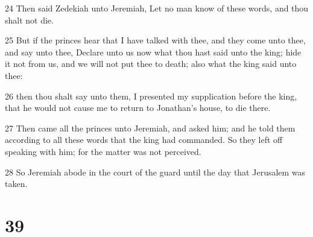 \par 24 Then said Zedekiah unto Jeremiah, Let no man know of these words, and thou shalt not die.
\par 25 But if the princes hear that I have talked with thee, and they come unto thee, and say unto thee, Declare unto us now what thou hast said unto the king; hide it not from us, and we will not put thee to death; also what the king said unto thee:
\par 26 then thou shalt say unto them, I presented my supplication before the king, that he would not cause me to return to Jonathan's house, to die there.
\par 27 Then came all the princes unto Jeremiah, and asked him; and he told them according to all these words that the king had commanded. So they left off speaking with him; for the matter was not perceived.
\par 28 So Jeremiah abode in the court of the guard until the day that Jerusalem was taken.

\chapter{39}

